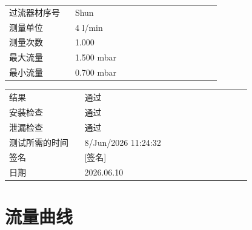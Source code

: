 \documentclass[UTF8,10pt,a4paper,fontset=fandol]{ctexart}
\newcommand{\fieldvalue}[1]{#1}
\newcommand{\handwritten}[1]{#1}
\begin{document}
\begin{small}
\begin{tabular}{@{}p{0.28\linewidth}p{0.62\linewidth}@{}}
过流器材序号 &
\fieldvalue{Shun} \\

测量单位 &
\fieldvalue{4 l/min} \\

测量次数 &
\fieldvalue{1.000} \\

最大流量 &
\fieldvalue{1.500 mbar} \\

最小流量 &
\fieldvalue{0.700 mbar} \\
\end{tabular}
\end{small}

\bigskip

\begin{small}
\begin{tabular}{@{}p{0.28\linewidth}p{0.62\linewidth}@{}}
结果 &
\fieldvalue{通过} \\

安装检查 &
\fieldvalue{通过} \\

泄漏检查 &
\fieldvalue{通过} \\

测试所需的时间 &
\fieldvalue{8/Jun/2026 11:24:32} \\

签名 &
\fieldvalue{\handwritten{[签名]}} \\

日期 &
\fieldvalue{\handwritten{2026.06.10}} \\
\end{tabular}
\end{small}

\bigskip

\section{流量曲线}
\end{document}

